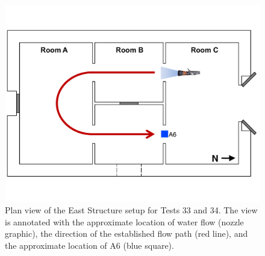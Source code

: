 \documentclass[12pt,oneside]{book}
\begin{document}
\begin{figure}[!ht]
	\includegraphics[width=\columnwidth]{../Figures/Floor_Plans/Specific_Tests/East_Hose_Test_Annotated}
	\caption[Plan view of the East Structure setup for Tests 33 and 34.]{Plan view of the East Structure setup for Tests 33 and 34. The view is annotated with the approximate location of water flow (nozzle graphic), the direction of the established flow path (red line), and the approximate location of A6 (blue square).}
	\label{fig:east_setup}
\end{figure}
\end{document}
